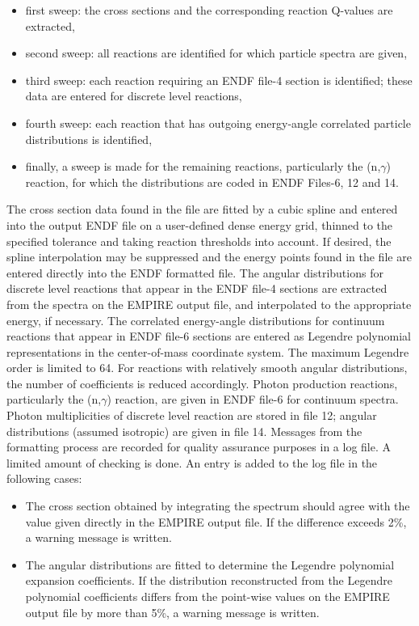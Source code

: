 \begin{itemize}
\item first sweep: the cross sections and the corresponding reaction
Q-values are extracted,

\item second sweep: all reactions are identified for which particle spectra
are given,

\item third sweep: each reaction requiring an ENDF file-4
section is identified; these data are entered for discrete level reactions,

\item fourth sweep: each reaction that has outgoing energy-angle
correlated particle distributions is identified,

\item finally, a sweep is made for the remaining reactions, particularly the
(n,$\gamma$) reaction, for which the distributions are coded in ENDF
Files-6, 12 and 14.
\end{itemize}

The cross section data found in the file are fitted by a cubic spline and
entered into the output ENDF file on a user-defined dense energy grid,
thinned to the specified tolerance and taking reaction thresholds into
account. If desired, the spline interpolation may be suppressed and the
energy points found in the file are entered directly into the ENDF formatted
file. The angular distributions for discrete level reactions that appear in
the ENDF file-4 sections are extracted from the spectra on the EMPIRE output
file, and interpolated to the appropriate energy, if necessary. The
correlated energy-angle distributions for continuum reactions that appear in
ENDF file-6 sections are entered as Legendre polynomial representations in
the center-of-mass coordinate system. The maximum Legendre order is limited
to 64. For reactions with relatively smooth angular distributions, the
number of coefficients is reduced accordingly. Photon production reactions,
particularly the (n,$\gamma$) reaction, are given in ENDF file-6 for
continuum spectra. Photon multiplicities of discrete level reaction are
stored in file 12; angular distributions (assumed isotropic) are given in
file 14. Messages from the formatting process are recorded for quality
assurance purposes in a log file. A limited amount of checking is done. An
entry is added to the log file in the following cases:

\begin{itemize}
\item The cross section obtained by integrating the spectrum should agree
with the value given directly in the EMPIRE output file. If the difference
exceeds 2\%, a warning message is written.

\item The angular distributions are fitted to determine the Legendre
polynomial expansion coefficients. If the distribution reconstructed from
the Legendre polynomial coefficients differs from the point-wise values on
the EMPIRE output file by more than 5\%, a warning message is written.
\end{itemize}


